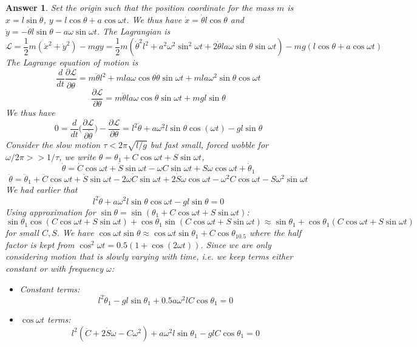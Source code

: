 \documentclass[a4paper]{article}
\newtheorem{ans}{Answer}[subsection]
\theoremstyle{new}
\begin{document}
\begin{ans}
Set the origin such that the position coordinate for the mass $m$ is $x=l\sin\theta$, $y=l\cos\theta+a\cos\omega t$. We thus have $\dot{x}=\dot{\theta}l\cos\theta$ and $\dot{y}=-\dot{\theta}l\sin\theta-a\omega\sin\omega t$. The Lagrangian is 
$$\mathcal{L}=\frac{1}{2}m(\dot{x}^2+\dot{y}^2)-mgy=\frac{1}{2}m(\dot{\theta}^2l^2+a^2\omega^2\sin^2\omega t+2\dot{\theta}la\omega\sin\theta\sin\omega t)-mg(l\cos\theta+a\cos\omega t)$$
The Lagrange equation of motion is
$$\frac{d}{dt}\frac{\partial\mathcal{L}}{\partial\dot{\theta}}=m\ddot{\theta}l^2+mla\omega\cos\theta\dot{\theta}\sin\omega t+mla\omega^2\sin\theta\cos\omega t $$
$$\frac{\partial\mathcal{L}}{\partial\theta}=m\dot{\theta}la\omega \cos\theta\sin\omega t+mgl\sin\theta$$
We thus have
$$0=\frac{d}{dt}\bigg(\frac{\partial\mathcal{L}}{\partial\dot{\theta}}\bigg)-\frac{\partial\mathcal{L}}{\partial\theta}=l^2\ddot{\theta}+a\omega^2l\sin\theta\cos(\omega t)-gl\sin\theta$$
Consider the slow motion $\tau<2\pi\sqrt{l/g}$ but fast small, forced wobble for $\omega/2\pi>>1/\tau$, we write $\theta=\theta_1+C\cos\omega t+S\sin\omega t$,
$$\dot{\theta}=\dot{C}\cos\omega t+\dot{S}\sin\omega t-\omega C\sin\omega t+S\omega \cos\omega t+\dot{\theta}_1$$
$$\ddot{\theta}=\ddot{\theta}_1+\ddot{C}\cos\omega t+\ddot{S}\sin\omega t-2\omega\dot{C}\sin\omega t+2\dot{S}\omega\cos\omega t-\omega^2C\cos\omega t-S\omega^2\sin\omega t$$
We had earlier that
$$l^2\ddot{\theta}+a\omega^2l\sin\theta\cos\omega t-gl\sin\theta=0$$
Using approximation for $\sin\theta=\sin(\theta_1+C\cos\omega t+S\sin\omega t)$:
$$\sin\theta_1\cos(C\cos\omega t+S\sin\omega t)+\cos\theta_1\sin(C\cos\omega t+S\sin\omega t)\approx\sin\theta_1+\cos\theta_1(C\cos\omega t+S\sin\omega t)$$
for small $C,S$. We have $\cos\omega t\sin\theta\approx\cos\omega t\sin\theta_1+C\cos\theta_10.5$ where the half factor is kept from $\cos^2\omega t=0.5(1+\cos(2\omega t))$. Since we are only considering motion that is slowly varying with time, i.e. we keep terms either constant or with frequency $\omega$:
\begin{itemize}
    \item Constant terms:
    \begin{equation}
    l^2\ddot{\theta}_1-gl\sin\theta_1+0.5a\omega^2lC\cos\theta_1=0\tag{2a}
    \end{equation}
    \item $\cos\omega t$ terms:
    \begin{equation}
    l^2(\ddot{C}+2\dot{S}\omega -C\omega^2)+a\omega^2l\sin\theta_1-glC\cos\theta_1=0\tag{2b}

\end{equation}
\end{itemize}
\end{ans}
\end{document}

